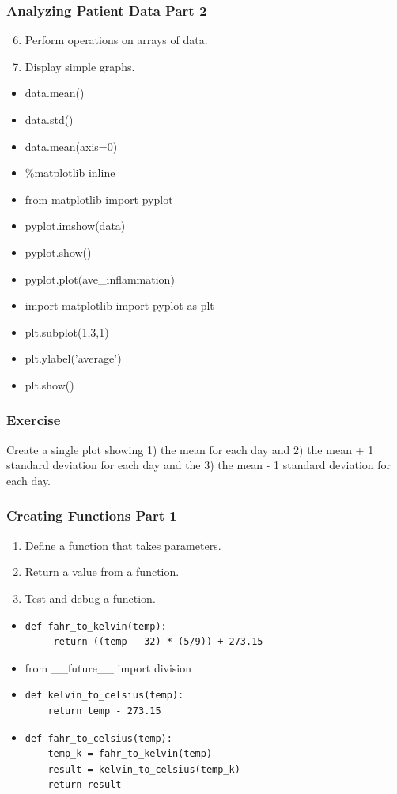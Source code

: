 \documentclass[xcolor=dvipsnames]{beamer}
\begin{document}
\begin{frame}
\frametitle{Analyzing Patient Data Part 2}
\begin{enumerate}
\setcounter{enumi}{5}
\item    Perform operations on arrays of data.    
\item    Display simple graphs.  
\end{enumerate}
\begin{multicols}{2}
\begin{itemize}
\item data.mean()
\item data.std()
\item data.mean(axis=0)
\item \%matplotlib inline
\item from matplotlib import pyplot 
\item pyplot.imshow(data)
\item pyplot.show()
\item pyplot.plot(ave\_inflammation)
\item import matplotlib import pyplot as plt
\item plt.subplot(1,3,1)
\item plt.ylabel('average')
\item plt.show()
\end{itemize}
\end{multicols}
\end{frame}


\begin{frame}
\frametitle{Exercise}
Create a single plot showing 1) the mean for each day and 2) the mean + 1 standard deviation for each day and the 3) the mean - 1 standard deviation for each day.
\end{frame}

\begin{frame}[fragile]
\frametitle{Creating Functions Part 1}
\begin{enumerate}
\item    Define a function that takes parameters.
\item    Return a value from a function.
\item    Test and debug a function.
\end{enumerate}
\begin{itemize}
\item 
\begin{verbatim} 
def fahr_to_kelvin(temp):
     return ((temp - 32) * (5/9)) + 273.15
\end{verbatim}
\item from \_\_future\_\_ import division
\item 
\begin{verbatim}
def kelvin_to_celsius(temp):
    return temp - 273.15
\end{verbatim}
\item 
\begin{verbatim}
def fahr_to_celsius(temp):
    temp_k = fahr_to_kelvin(temp)
    result = kelvin_to_celsius(temp_k)
    return result
\end{verbatim}
\end{itemize}
\end{frame}
\end{document}
